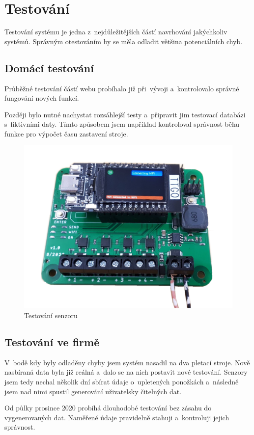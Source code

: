 \chapter{Testování}
Testování systému je jedna z~nejdůležitějších částí navrhování jakýchkoliv systémů.
Správným otestováním by se měla odladit většina potenciálních chyb.


\fxnote[author=JPA]{\textcolor{mygreen}{Měli bychom probrat tuto kapitolu}}


\section{Domácí testování}
Průběžné testování částí webu probíhalo již při~vývoji a~kontrolovalo správné fungování nových funkcí.

Později bylo nutné nachystat rozsáhlejší testy a~připravit jim testovací databázi s~fiktivními daty.
Tímto způsobem jsem například kontroloval správnost běhu funkce pro výpočet času zastavení stroje.

\begin{figure}[htbp]
    \centering
    \includegraphics[width=\textwidth]{img/Testovani.png}
    \caption{Testování senzoru}
    \label{fig:SenzorNaStroji}
\end{figure}

\section{Testování ve firmě}
V~bodě kdy byly odladěny chyby jsem systém nasadil na dva pletací stroje.
Nově nasbíraná data byla již reálná a~dalo se na nich postavit nové testování.
Senzory jsem tedy nechal několik dní sbírat údaje o~upletených ponožkách a~následně jsem nad nimi spustil generování uživatelsky čitelných dat.

Od půlky prosince 2020 probíhá dlouhodobé testování bez zásahu do vygenerovaných dat. Naměřené údaje pravidelně stahuji a~kontroluji jejich správnost.

\newpage